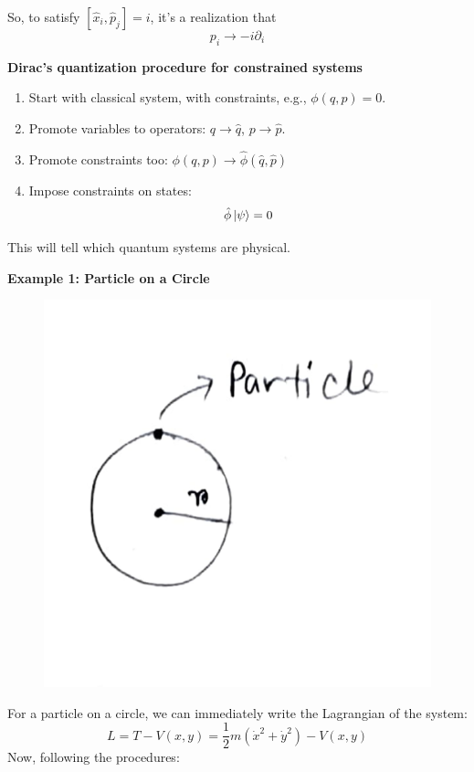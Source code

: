 \documentclass[14pt]{article} %
\begin{document}
So, to satisfy $[\hat{x}_i, \hat{p}_j] = i$, it's a realization that
\[
p_i \to -i \partial_i
\]
\begin{framed}
\noindent
\textbf{Dirac's quantization procedure for constrained systems}
\begin{enumerate}
\item Start with classical system, with constraints, e.g., $\phi(q, p) = 0$.
\item Promote variables to operators: $q \to \hat{q}$, $p \to \hat{p}$.
\item Promote constraints too: \quad $\phi(q,p) \rightarrow \hat{\phi}(\hat{q}, \hat{p})$
\item Impose constraints on states: $$\hat{\phi} \ket{\psi} = 0$$
\end{enumerate}
This will tell which quantum systems are physical.
\end{framed}
\noindent
\textbf{Example 1: Particle on a Circle}\\
\vspace{-0.7cm}
\begin{figure}[H]
\centering
\includegraphics[width=0.3\linewidth]{L0_2 (1).jpg}
\caption*{}
\end{figure}
\vspace{-1.6cm}
For a particle on a circle, we can immediately write the  Lagrangian of the system:
\[
L = T - V(x,y)= \frac{1}{2}m\left( \dot{x}^2 + \dot{y}^2 \right) - V(x,y) \tag{6} \label{eq:6}
\]
Now, following the procedures:
\end{document}

